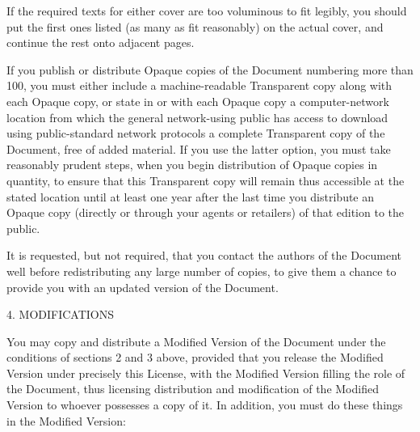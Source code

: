 \documentclass[11pt]{article}
\begin{document}
If the required texts for either cover are too voluminous to fit
legibly, you should put the first ones listed (as many as fit
reasonably) on the actual cover, and continue the rest onto adjacent
pages.

If you publish or distribute Opaque copies of the Document numbering
more than 100, you must either include a machine-readable Transparent
copy along with each Opaque copy, or state in or with each Opaque copy
a computer-network location from which the general network-using
public has access to download using public-standard network protocols
a complete Transparent copy of the Document, free of added material.
If you use the latter option, you must take reasonably prudent steps,
when you begin distribution of Opaque copies in quantity, to ensure
that this Transparent copy will remain thus accessible at the stated
location until at least one year after the last time you distribute an
Opaque copy (directly or through your agents or retailers) of that
edition to the public.

It is requested, but not required, that you contact the authors of the
Document well before redistributing any large number of copies, to
give them a chance to provide you with an updated version of the
Document.


4. MODIFICATIONS

You may copy and distribute a Modified Version of the Document under
the conditions of sections 2 and 3 above, provided that you release
the Modified Version under precisely this License, with the Modified
Version filling the role of the Document, thus licensing distribution
and modification of the Modified Version to whoever possesses a copy
of it.  In addition, you must do these things in the Modified Version:
\end{document}
